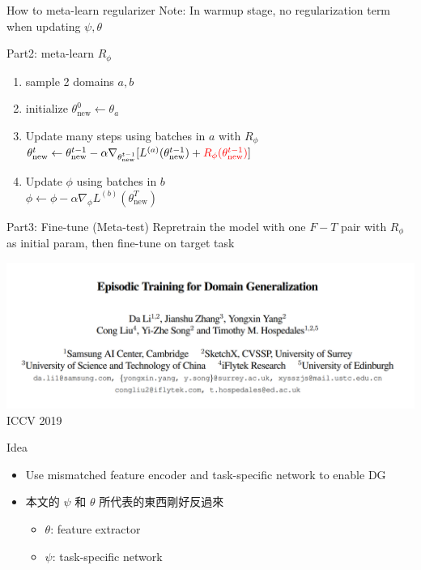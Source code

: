 \documentclass{beamer}
\begin{document}
\begin{frame}{How to meta-learn regularizer}
  Note: In warmup stage, no regularization term when updating $\psi, \theta$

  \begin{block}{Part2: meta-learn $R_\phi$}
    \begin{enumerate}
      \item sample 2 domains $a,b$
      \item initialize $\theta_{\text{new}}^0 \leftarrow \theta_a$
      \item Update many steps using batches in $a$ with $R_\phi$\\
        $\theta_{\text{new}}^t \leftarrow \theta_{\text{new}}^{t-1} - \alpha \nabla_{\theta_{\text{new}}^{t-1}}[L^{(a)}(\theta_{\text{new}}^{t-1}) + {\color{red}{R_\phi}(\theta_{\text{new}}^{t-1})}]$
      \item Update $\phi$ using batches in $b$\\
        $\phi \leftarrow \phi - \alpha \nabla_\phi L^{(b)}(\theta^T_{\text{new}})$
    \end{enumerate}
  \end{block}
\end{frame}

\begin{frame}{Part3: Fine-tune (Meta-test)}
  Repretrain the model with one $F-T$ pair with $R_\phi$ as initial param, then fine-tune on target task
\end{frame}

\begin{frame}
  \includegraphics[width=\textwidth]{fig/EpiFCR-title.png}
  \center ICCV 2019
\end{frame}

\begin{frame}{Idea}
  \begin{itemize}
    \item Use mismatched feature encoder and task-specific network to enable DG
    \item 本文的 $\psi$ 和 $\theta$ 所代表的東西剛好反過來
      \begin{itemize}
        \item $\theta$: feature extractor
        \item $\psi$: task-specific network
      \end{itemize}
  \end{itemize}
\end{frame}
\end{document}
